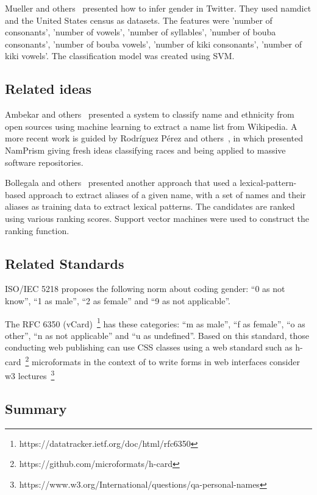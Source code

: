 \documentclass[a4paper]{article}
\begin{document}
Mueller and others~\cite{mueller2016gender} presented how to
infer gender in Twitter. They used namdict and the United States
census as datasets. The features were 'number of consonants',
'number of vowels', 'number of syllables', 'number of bouba
consonants', 'number of bouba vowels', 'number of kiki consonants',
'number of kiki vowels'. The classification model was created using SVM.

\subsection{Related ideas}

Ambekar and others~\cite{ambekar2009name} presented a
system to classify name and ethnicity from open sources
using machine learning to extract a name list from Wikipedia.
A more recent work is guided by Rodríguez
Pérez and others~\cite{nadri2021relationship}, in
which presented NamPrism giving fresh ideas classifying
races and being applied to massive software repositories.

Bollegala and others~\cite{bollegala2010automatic} presented
another approach that
used a lexical-pattern-based approach to extract aliases of a
given name, with a set of names and their aliases as training
data to extract lexical patterns. The candidates are ranked
using various ranking scores. Support vector machines were
used to construct the ranking function.

\subsection{Related Standards}

ISO/IEC 5218 proposes the following norm about coding
gender: ``0 as not know'', ``1 as male'', ``2 as female''
and ``9 as not applicable''.

The RFC 6350
(vCard)~\footnote{https://datatracker.ietf.org/doc/html/rfc6350}
has these categories: ``m as male'', ``f as
female'', ``o as other'', ``n as not applicable'' and ``u as
undefined''. Based on this standard, those conducting web
publishing can use CSS classes using a web standard such as
h-card~\footnote{https://github.com/microformats/h-card}
microformats in the context of to write forms in web interfaces
consider w3 lectures~\footnote{https://www.w3.org/International/questions/qa-personal-names}

\subsection{Summary}
\end{document}

